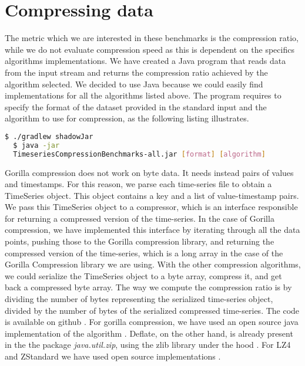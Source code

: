 \section{Compressing data}
The metric which we are interested in these benchmarks is the compression ratio, while we do not evaluate compression speed
as this is dependent on the specifics algorithms implementations.
We have created a Java program that reads data from the input stream and returns the compression ratio
achieved by the algorithm selected. We decided to use Java because we could easily find implementations for
all the algorithms listed above.
The program requires to specify the format of the dataset provided in the standard input and the
algorithm to use for compression, as the following listing illustrates.
\lstset{
    basicstyle=\small,
    stringstyle=\ttfamily
}
\begin{lstlisting}[language=bash]
  $ ./gradlew shadowJar
  $ java -jar
  TimeseriesCompressionBenchmarks-all.jar [format] [algorithm]
\end{lstlisting}
Gorilla compression does not work on byte data. It needs instead pairs of values and timestamps.
For this reason, we parse each time-series file to obtain a TimeSeries object.
This object contains a key and a list of value-timestamp pairs.  
We pass this TimeSeries object to a compressor, which is an interface responsible for returning a compressed version of the time-series.
In the case of Gorilla compression, we have implemented this interface by iterating through all
the data points, pushing those to the Gorilla compression library, and returning the compressed
version of the time-series, which is a long array in the case of the Gorilla Compression library we are using.
With the other compression algorithms, we could serialize the TimeSeries
object to a byte array, compress it, and get back a compressed byte array. 
The way we compute the compression ratio is by dividing the number of bytes representing the serialized
time-series object, divided by the number of bytes of the serialized compressed time-series.
The code is available on github \cite{dovidio_2019_dovidiotscompressionthesis}.
For gorilla compression, we have used an open source java implementation of the algorithm
\cite{burmanm_2018_burmanmgorillatsc}. Deflate, on the other hand, is already present in the the package
\textit{java.util.zip}, using the zlib library under the hood \cite{a2019_deflater}.
For LZ4 and ZStandard we have used open source implementations \cite{lz4_2019_lz4lz4java}\cite{luben_2015_lubenzstdjni}.

